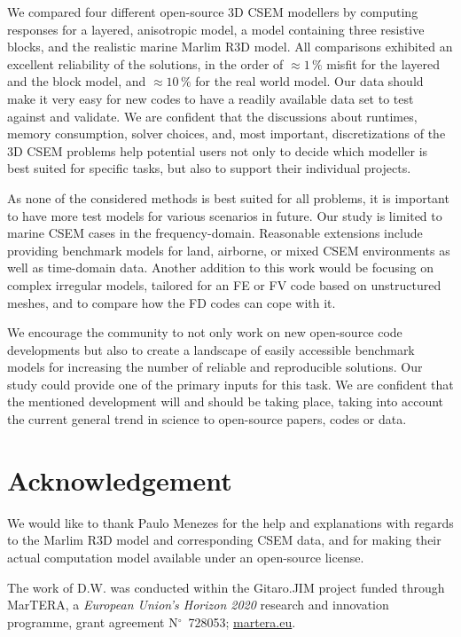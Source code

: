 \documentclass[
    paper,
  ]{geophysics}
\begin{document}
We compared four different open-source 3D CSEM modellers by computing responses for a layered, anisotropic model, a model containing three resistive blocks, and the realistic marine Marlim R3D model. All comparisons exhibited an excellent reliability of the solutions, in the order of $\approx1\,\%$ misfit for the layered and the block model, and $\approx10\,\%$ for the real world model. Our data should make it very easy for new codes to have a readily available data set to test against and validate. We are confident that the discussions about runtimes, memory consumption, solver choices, and, most important, discretizations of the 3D CSEM problems help potential users not only to decide which modeller is best suited for specific tasks, but also to support their individual projects.

As none of the considered methods is best suited for all problems, it is important to have more test models for various scenarios in future. Our study is limited to marine CSEM cases in the frequency-domain. Reasonable extensions include providing benchmark models for land, airborne, or mixed CSEM environments as well as time-domain data. Another addition to this work would be focusing on complex irregular  models, tailored for an FE or FV code based on unstructured meshes, and to compare how the FD codes can cope with it.

We encourage the community to not only work on new open-source code developments but also to create a landscape of easily accessible benchmark models for increasing the number of reliable and reproducible solutions. Our study could provide one of the primary inputs for this task. We are confident that the mentioned development will and should be taking place, taking into account the current general trend in science to open-source papers, codes or data.




\section{Acknowledgement}

We would like to thank Paulo Menezes for the help and explanations with regards to the Marlim R3D model and corresponding CSEM data, and for making their actual computation model available under an open-source license.

The work of D.W. was conducted within the Gitaro.JIM project funded through MarTERA, a \emph{European Union's Horizon 2020} research and innovation programme, grant agreement N$^\circ$~728053; \href{https://www.martera.eu}{martera.eu}.
\end{document}
